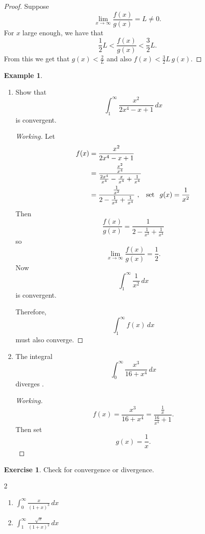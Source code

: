 \documentclass[12pt,a4paper]{report}
\theoremstyle{definition}
\newtheorem{exa}[thm]{Example}
\newtheorem{exe}[thm]{Exercise}
\theoremstyle{plain}
\begin{document}
\begin{proof}
Suppose $$\lim_{x\rightarrow \infty} \frac{f(x)}{g(x)} = L \neq 0.$$ For $x$ large enough, we have that $$\frac{1}{2} L < \frac{f(x)}{g(x)} < \frac{3}{2}L.$$ From this we get that  $g(x) < \frac{2}{L}$ and also $f(x)  < \frac{3}{2}L\, g(x)$.
\end{proof}


\begin{exa}\textbf{}
\vspace*{-5mm}
\begin{enumerate}
\item[(a).] Show that $$\int_1^{\infty} \frac{x^2}{2x^4 - x + 1}\, dx$$ is convergent.

\begin{proof}[Working]
Let 
\begin{align*}
f(x) & = \frac{x^2}{2x^4 - x + 1}\\
     & = \frac{\frac{x^2}{x^4}}{\frac{2x^4}{x^4} - \frac{x}{x^4} + \frac{1}{x^4}}\\
     & = \frac{\frac{1}{x^2}}{2 - \frac{1}{x^3} + \frac{1}{x^4}}\, \, , \hspace{0.3cm} \text{set}\, \hspace{0.2cm}g(x) = \frac{1}{x^2}
\end{align*}
Then $$\frac{f(x)}{g(x)} = \frac{1}{2 - \frac{1}{x^3} + \frac{1}{x^4}}$$ so $$\lim_{x\rightarrow \infty} \frac{f(x)}{g(x)} = \frac{1}{2}.$$
Now $$\int_1^{\infty} \frac{1}{x^2}\, dx$$ is convergent.


Therefore, $$\int_1^{\infty} f(x)\, dx $$ must also converge.
\end{proof}




\item[(b).] The integral $$\int_0^{\infty} \frac{x^3}{16 + x^4}\, dx$$ diverges .

\begin{proof}[Working]
$$f(x) = \frac{x^3}{16 + x^4} =  \frac{\frac{1}{x}}{\frac{16}{x^4} + 1}.$$ Then set $$g(x) = \frac{1}{x}.$$
\end{proof}
\end{enumerate}
\end{exa}




\begin{exe}
Check for convergence or divergence.
\begin{multicols}{2}
\begin{enumerate}
\item[(a).] $\displaystyle{\int_0^{\infty} \frac{x}{(1 + x)^3}}\, dx$
\item[(b).] $\displaystyle{\int_1^{\infty} \frac{\sqrt{x}}{(1 + x)^2}}\, dx$
\end{enumerate}
\end{multicols}
\end{exe}
\end{document}
